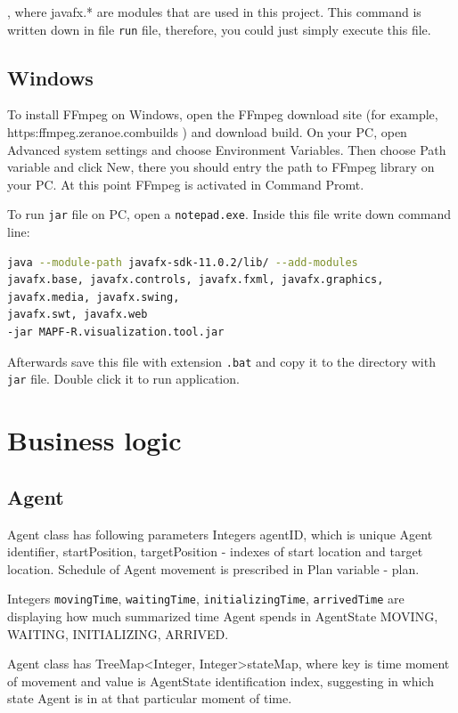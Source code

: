 \documentclass[thesis=B,english]{FITthesis}[2019/12/23]
\begin{document}
, where javafx.* are modules that are used in this project. This command is written down in file \verb|run| file, therefore, you could just simply execute this file.

\subsection{Windows}

To install FFmpeg on Windows, open the FFmpeg download site (for example,  https:\/\/ffmpeg.zeranoe.com\/builds\/ ) and download build. On your PC, open Advanced system settings and choose Environment Variables. Then choose Path variable and click New, there you should entry the path to FFmpeg library on your PC. At this point FFmpeg is activated in Command Promt.

To run \verb|jar| file on PC, open a \verb|notepad.exe|. Inside this file write down command line:
\begin{lstlisting}[language=bash]
java --module-path javafx-sdk-11.0.2/lib/ --add-modules 
javafx.base, javafx.controls, javafx.fxml, javafx.graphics, 
javafx.media, javafx.swing, 
javafx.swt, javafx.web
-jar MAPF-R.visualization.tool.jar
\end{lstlisting}   

Afterwards save this file with extension \verb|.bat| and copy it to the directory with \verb|jar| file. Double click it to run application. 

\section{Business logic}

\subsection{Agent}

Agent class has following parameters Integers agentID, which is unique Agent identifier, startPosition, targetPosition - indexes of start location and target location. Schedule of Agent movement is prescribed in Plan variable - plan.

Integers \verb|movingTime|, \verb|waitingTime|, \verb|initializingTime|, \verb|arrivedTime| are displaying how much summarized time Agent spends in AgentState MOVING, WAITING, INITIALIZING, ARRIVED. 

Agent class has TreeMap\textless Integer, Integer\textgreater stateMap, where key is time moment of movement and value is AgentState identification index, suggesting in which state Agent is in at that particular moment of time.
\end{document}
